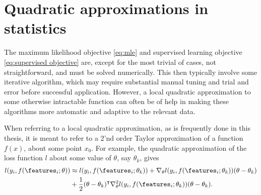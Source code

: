 \chapter{Quadratic approximations in statistics} 
\label{chap:quadratics}


The maximum likelihood objective \eqref{eq:mle} and supervised learning objective \eqref{eq:supervised objective} are, except for the most trivial of cases, not straightforward, and must be solved numerically.
This then typically involve some iterative algorithm, which may require substantial manual tuning and trial and error before successful application. 
However, a local quadratic approximation to some otherwise intractable function can often be of help in making these algorithms more automatic and adaptive to the relevant data.

When referring to a local quadratic approximation, as is frequently done in this thesis, it is meant to refer to a 2'nd order Taylor approximation of a function $f(x)$, about some point $x_0$.
For example, the quadratic approximation of the loss function $l$ about some value of $\theta$, say $\theta_k$, gives
\begin{align}\label{eq:quadratic approximation}
	l(y_i,f(\features_i;\theta))
	&\approx
	l(y_i,f(\features_i;\theta_k))
	+ \nabla_\theta l(y_i,f(\features_i;\theta_k)) (\theta-\theta_k)\notag\\
	&+ \frac{1}{2}(\theta-\theta_k)^\intercal \nabla_\theta^2 l(y_i,f(\features_i;\theta_k)) (\theta-\theta_k).
\end{align}

